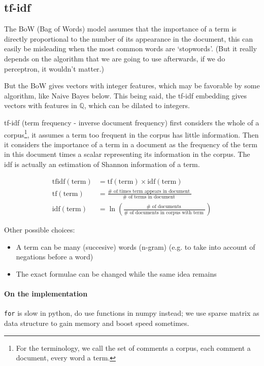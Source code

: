 \documentclass{article}
\begin{document}
\subsection{tf-idf}

The BoW (Bag of Words) model assumes that the importance of a term is directly proportional to
the number of its appearance in the document, this can easily be misleading
when the most common words are `stopwords'. (But it really depends on
the algorithm that we are going to use afterwards, if we do perceptron, it wouldn't matter.)

But the BoW gives vectors with integer features, which may be favorable by some algorithm,
like Naive Bayes below. This being said, the tf-idf embedding gives vectors with features in $\mathbb{Q}$,
which can be dilated to integers.

tf-idf (term frequency - inverse document frequency) first considers
the whole of a corpus\footnote{For the terminology, we call the set of comments a corpus,
each comment a document, every word a term.}, it assumes a term too frequent in the corpus has little
information. Then it considers the importance of a term in a document
as the frequency of the term in this document times a scalar
representing its information in the corpus. The idf is actually an estimation
of Shannon information of a term.

$$
\begin{aligned}
\mathrm{tfidf}(\mathrm{term}) & = \mathrm{tf}(\mathrm{term}) \times \mathrm{idf}(\mathrm{term}) \\
\mathrm{tf}(\mathrm{term}) & = \frac{\# \text { of times term appears in document }}{\# \text { of terms in document }} \\
\mathrm{idf}(\mathrm{term}) & =\ln \left(\frac{\# \text { of documents }}{\# \text { of documents in corpus with term }}\right)
\end{aligned}
$$

Other possible choices:

\begin{itemize}
  \item A term can be many (succesive) words (n-gram) (e.g. to
  take into account of negations before a word)
  \item The exact formulae can be changed while the same idea remains
\end{itemize}

\paragraph{On the implementation} \verb|for| is slow in python, do use
functions in numpy instead; we use sparse matrix as data structure to
gain memory and boost speed sometimes.
\end{document}
